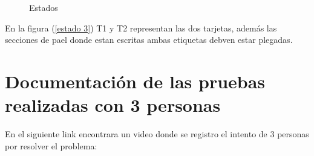 \documentclass{article}
\begin{document}
\begin{figure}[H]
 \centering
 \caption{Estados}
 \label{f:estados}
\end{figure}

En la figura (\ref{estado 3}) T1 y T2 representan las dos tarjetas, además las secciones de pael donde estan escritas ambas etiquetas debven estar plegadas.


\section{Documentación de las pruebas realizadas con 3 personas}
En el siguiente link encontrara un video donde se registro el intento de 3 personas por resolver el problema:
\end{document}
